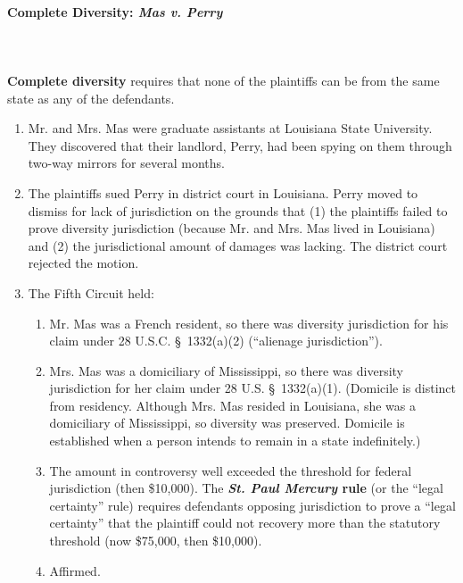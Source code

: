 \paragraph{Complete Diversity: \emph{Mas v. Perry}}
~\\\\
\textbf{Complete diversity} requires that none of the plaintiffs can be from 
the same state as any of the defendants.

\begin{enumerate}
    \item Mr. and Mrs. Mas were graduate assistants at Louisiana State 
    University. They discovered that their landlord, Perry, had been spying on 
    them through two-way mirrors for several months.
    \item The plaintiffs sued Perry in district court in Louisiana. Perry 
    moved to dismiss for lack of jurisdiction on the grounds that (1) the 
    plaintiffs failed to prove diversity jurisdiction (because Mr. and Mrs.  
    Mas lived in Louisiana) and (2) the jurisdictional amount of damages was 
    lacking. The district court rejected the motion.
    \item The Fifth Circuit held:
    \begin{enumerate}
        \item Mr. Mas was a French resident, so there was diversity 
        jurisdiction for his claim under 28 U.S.C. \S\ 1332(a)(2) (``alienage 
        jurisdiction'').
        \item Mrs. Mas was a domiciliary of Mississippi, so there was 
        diversity jurisdiction for her claim under 28 U.S. \S\ 1332(a)(1).  
        (Domicile is distinct from residency. Although Mrs. Mas resided in 
        Louisiana, she was a domiciliary of Mississippi, so diversity was 
        preserved. Domicile is established when a person intends to remain in 
        a state indefinitely.)
        \item The amount in controversy well exceeded the threshold for 
        federal jurisdiction (then \$10,000). The \textbf{\emph{St. Paul 
        Mercury} rule} (or the ``legal certainty'' rule) requires defendants 
        opposing jurisdiction to prove a ``legal certainty'' that the 
        plaintiff could not recovery more than the statutory threshold (now 
        \$75,000, then \$10,000).
        \item Affirmed.
    \end{enumerate}
\end{enumerate}

